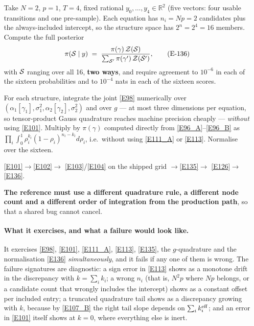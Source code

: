 \begin{definition}\label{def:check}
Take $N=2$, $p=1$, $T=4$, fixed rational $y_0,\dots,y_4\in\mathbb{R}^2$ (five
vectors: four usable transitions and one pre-sample). Each equation has $n_i=Np=2$
candidates plus the always-included intercept, so the structure space has
$2^n=2^4=16$ members. Compute the full posterior
\begin{equation}
\pi(\mathcal{S}\mid y) \;=\; \frac{\pi(\gamma)\,\mathcal{Z}(\mathcal{S})}{\sum_{\mathcal{S}'}\pi(\gamma')\,\mathcal{Z}(\mathcal{S}')},
\tag{E-136}\label{E136}
\end{equation}
with $\mathcal{S}$ ranging over all 16, \textbf{two ways}, and require agreement to $10^{-6}$ in each of the sixteen
probabilities and to $10^{-4}$ nats in each of the sixteen scores.
\begin{description}[style=nextline, leftmargin=2em, topsep=0pt, itemsep=0pt]
\item[Reference.]
  For each structure, integrate the joint \eqref{E98} numerically over
  $(\alpha_1[\gamma_1],\sigma_1^2,\alpha_2[\gamma_2],\sigma_2^2)$ and over $g$ --- at
  most three dimensions per equation, so tensor-product Gauss quadrature reaches
  machine precision cheaply --- \emph{without} using \eqref{E101}. Multiply by
  $\pi(\gamma)$ computed directly from \eqref{E96_A}--\eqref{E96_B} as
  $\prod_i\int_0^1\rho_i^{k_i}(1-\rho_i)^{n_i-k_i}d\rho_i$, i.e.\ without using
  \eqref{E111_A} or \eqref{E113}. Normalise over the sixteen.
\item[Production path.]
  \eqref{E101}$\to$\eqref{E102}$\to$ \eqref{E103}/\eqref{E104} on the shipped grid
  $\to$\eqref{E135}$\to$ \eqref{E126}$\to$\eqref{E136}.
\end{description}
\textbf{The reference must use a different quadrature rule, a different node count
and a different order of integration from the production path}, so that a shared bug
cannot cancel.
\end{definition}

\paragraph{What it exercises, and what a failure would look like.} It exercises
\eqref{E98}, \eqref{E101}, \eqref{E111_A}, \eqref{E113}, \eqref{E135}, the
$g$-quadrature and the normalisation \eqref{E136} \emph{simultaneously}, and it fails
if any one of them is wrong. The failure signatures are diagnostic: a sign error in
\eqref{E113} shows as a monotone drift in the discrepancy with $k=\sum_ik_i$; a wrong
$n_i$ (that is, $N^2p$ where $Np$ belongs, or a candidate count that wrongly includes
the intercept) shows as a constant offset per included entry; a truncated quadrature
tail shows as a discrepancy growing with $k$, because by \eqref{E107_B} the right tail
slope depends on $\sum_ik_i^{\mathrm{eff}}$; and an error in \eqref{E101} itself shows at
$k=0$, where everything else is inert.

